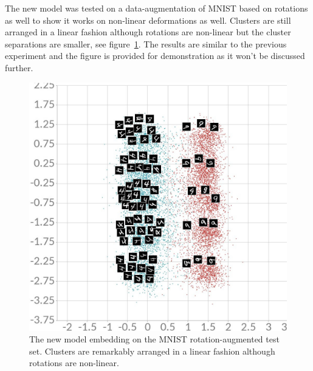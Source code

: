 \documentclass[a4paper,12pt]{report}
\begin{document}
The new model was tested on a data-augmentation of MNIST based on rotations as well to show it works on non-linear deformations as well.
Clusters are still arranged in a linear fashion although rotations are non-linear but the cluster separations are smaller, see figure~\ref{fig:mnist_cl2d_rotate}.
The results are similar to the previous experiment and the figure is provided for demonstration as it won't be discussed further.

\begin{figure}[h]
    \begin{center}
        \includegraphics{thesis_figures/mnist_cl2d_rotate.jpg}
    \end{center}
    \caption{The new model embedding on the MNIST rotation-augmented test set.
    Clusters are remarkably arranged in a linear fashion although rotations are non-linear.
    }
    \label{fig:mnist_cl2d_rotate}
\end{figure}
\end{document}
